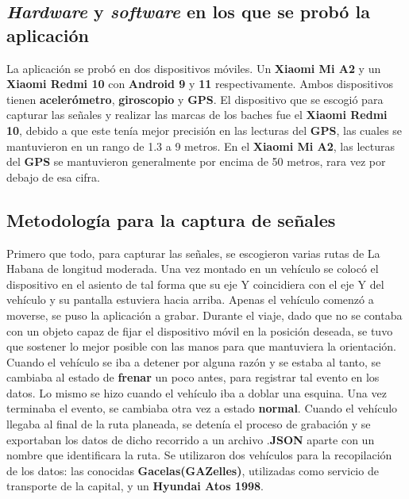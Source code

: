 	\subsection{\emph{Hardware} y \emph{software} en los que se probó la aplicación}
		La aplicación se probó en dos dispositivos móviles. Un \textbf{Xiaomi Mi A2} y un \textbf{Xiaomi Redmi 10} con \textbf{Android 9} y
		\textbf{11} respectivamente. Ambos dispositivos tienen \textbf{acelerómetro}, \textbf{giroscopio} y \textbf{GPS}. El dispositivo que 
		se escogió para capturar las señales y realizar las marcas de los baches fue el \textbf{Xiaomi Redmi 10}, debido a que este tenía mejor
		precisión en las lecturas del \textbf{GPS}, las cuales se mantuvieron en un rango de 1.3 a 9 metros. En el \textbf{Xiaomi Mi A2}, las 
		lecturas del \textbf{GPS} se mantuvieron generalmente por encima de 50 metros, rara vez por debajo de esa cifra.

	\subsection{Metodología para la captura de señales}
		Primero que todo, para capturar las señales, se escogieron varias rutas de La Habana de longitud moderada. Una vez montado en un vehículo
		se colocó el dispositivo en el asiento de tal forma que su eje Y coincidiera con el eje Y del vehículo y su pantalla estuviera hacia arriba.
		Apenas el vehículo comenzó a moverse, se puso la aplicación a grabar. Durante el viaje, dado que no se contaba con un objeto capaz de fijar el
		dispositivo móvil en la posición deseada, se tuvo que sostener lo mejor posible con las manos para que mantuviera la orientación. \\
		\indent Cuando el vehículo se iba a detener por alguna razón y se estaba al tanto, se cambiaba al estado de \textbf{frenar} un poco antes, para
		registrar tal evento en los datos. Lo mismo se hizo cuando el vehículo iba a doblar una esquina. Una vez terminaba el evento, se cambiaba otra
		vez a estado \textbf{normal}. Cuando el vehículo llegaba al final de la ruta planeada, se detenía el proceso de grabación y se exportaban los
		datos de dicho recorrido a un archivo .\textbf{JSON} aparte con un nombre que identificara la ruta. Se utilizaron dos vehículos para la
		recopilación de los datos: las conocidas \textbf{Gacelas(GAZelles)}, utilizadas como servicio de transporte de la capital,  
		y un \textbf{Hyundai Atos 1998}.

